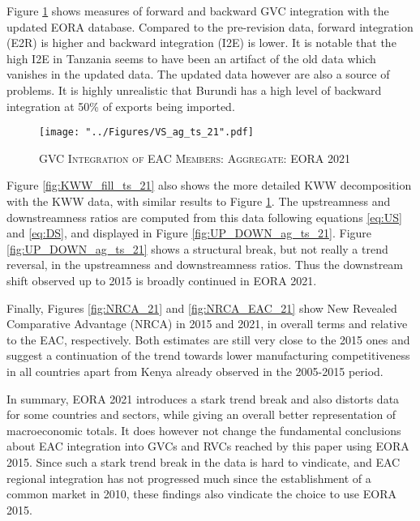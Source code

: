 \documentclass[a4paper]{article}
\begin{document}
Figure \ref{fig:VSag_ts_21} shows measures of forward and backward GVC integration with the updated EORA database. Compared to the pre-revision data, forward integration (E2R) is higher and backward integration (I2E) is lower. It is notable that the high I2E in Tanzania seems to have been an artifact of the old data which vanishes in the updated data. The updated data however are also a source of problems. It is highly unrealistic that Burundi has a high level of backward integration at 50\% of exports being imported. 

\begin{figure}[h!] %
\centering
\caption{\label{fig:VSag_ts_21}\textsc{GVC Integration of EAC Members: Aggregate: EORA 2021}}
\texttt{[image: "../Figures/VS\_ag\_ts\_21".pdf]} %
\end{figure}
\FloatBarrier

Figure \ref{fig:KWW_fill_ts_21} also shows the more detailed KWW decomposition with the KWW data, with similar results to Figure \ref{fig:VSag_ts_21}. The upstreamness and downstreamness ratios are computed from this data following equations \ref{eq:US} and \ref{eq:DS}, and displayed in Figure \ref{fig:UP_DOWN_ag_ts_21}. Figure \ref{fig:UP_DOWN_ag_ts_21} shows a structural break, but not really a trend reversal, in the upstreamness and downstreamness ratios. Thus the downstream shift observed up to 2015 is broadly continued in EORA 2021. \newline

Finally, Figures \ref{fig:NRCA_21} and \ref{fig:NRCA_EAC_21} show New Revealed Comparative Advantage (NRCA) in 2015 and 2021, in overall terms and relative to the EAC, respectively. Both estimates are still very close to the 2015 ones and suggest a continuation of the trend towards lower manufacturing competitiveness in all countries apart from Kenya already observed in the 2005-2015 period. \newline

In summary, EORA 2021 introduces a stark trend break and also distorts data for some countries and sectors, while giving an overall better representation of macroeconomic totals. It does however not change the fundamental conclusions about EAC integration into GVCs and RVCs reached by this paper using EORA 2015. Since such a stark trend break in the data is hard to vindicate, and EAC regional integration has not progressed much since the establishment of a common market in 2010, these findings also vindicate the choice to use EORA 2015.  
\end{document}
